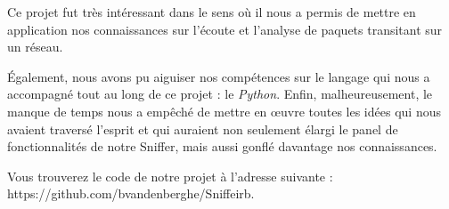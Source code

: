 Ce projet fut très intéressant dans le sens où il nous a permis de mettre en application nos connaissances sur l'écoute et l'analyse de paquets transitant sur un réseau. 

Également, nous avons pu aiguiser nos compétences sur le langage qui nous a accompagné tout au long de ce projet : le \emph{Python}. Enfin, malheureusement, le manque de temps nous a empêché de mettre en \oe uvre toutes les idées qui nous avaient traversé l'esprit et qui auraient non seulement élargi le panel de fonctionnalités de notre Sniffer, mais aussi gonflé davantage nos connaissances.

Vous trouverez le code de notre projet à l'adresse suivante : https://github.com/bvandenberghe/Sniffeirb.
